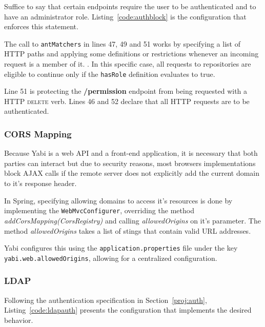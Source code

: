 Suffice to say that certain endpoints require the user to be authenticated and to have an administrator role. Listing~\ref{code:authblock} is the configuration that enforces this statement.

The call to \texttt{antMatchers} in lines 47, 49 and 51 works by specifying a list of \gls{HTTP} paths and applying some definitions or restrictions whenever an incoming request is a member of it. . In this specific case, all requests to repositories are eligible to continue only if the \texttt{hasRole} definition evaluates to true.

Line 51 is protecting the \textbf{/permission} endpoint from being requested with a \gls{HTTP} \textsc{delete} verb.
Lines 46 and 52 declare that all \gls{HTTP} requests are to be authenticated.



\subsubsection{\gls{CORS} Mapping}

Because \gls{Yabi} is a web \gls{API} and a front-end application, it is necessary that both parties can interact but due to security reasons, most browsers implementations block \gls{AJAX} calls if the remote server does not explicitly add the current domain to it's response header.

In Spring, specifying allowing domains to access it's resources is done by implementing the \texttt{WebMvcConfigurer}, overriding the method \textit{addCorsMapping(CorsRegistry)} and calling \textit{allowedOrigins} on it's parameter. The method \textit{allowedOrigins} takes a list of stings that contain valid \gls{URL} addresses.

\gls{Yabi} configures this using the \texttt{application.properties} file under the key \texttt{yabi.web.allowedOrigins}, allowing for a centralized configuration.

\subsubsection{\gls{LDAP}}\label{impl:ldap}

Following the authentication specification in Section~\ref{proj:auth}, Listing~\ref{code:ldapauth} presents the configuration that implements the desired behavior.

